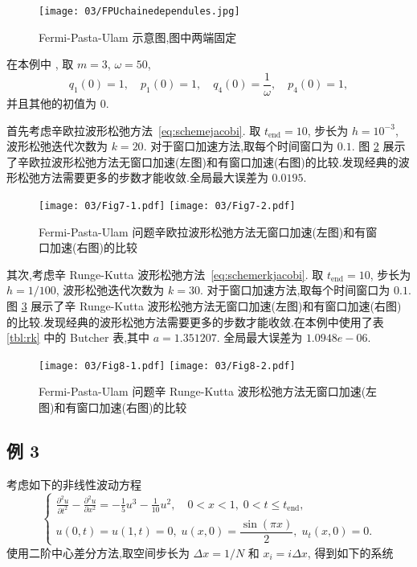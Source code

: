 \begin{figure}[h!]
  \centering
  \texttt{[image: 03/FPUchainedependules.jpg]}
  \caption{Fermi-Pasta-Ulam 示意图,图中两端固定}
  \label{fig:fpu}
\end{figure}

在本例中 \cite{hairer2006geometric}, 取 $m=3$, $\omega = 50$,
\begin{equation*}
  q_1(0) = 1, \quad p_1(0) = 1, \quad q_4(0) = \frac{1}{\omega}, \quad p_4(0) = 1,
\end{equation*}
并且其他的初值为 $0$.

首先考虑辛欧拉波形松弛方法~\eqref{eq:schemejacobi}. 取 $t_{\text{end}} = 10$, 步长为 $h = 10^{-3}$, 波形松弛迭代次数为 $k=20$. 对于窗口加速方法,取每个时间窗口为 $0.1$. 图 \ref{fig:ex2seucom} 展示了辛欧拉波形松弛方法无窗口加速(左图)和有窗口加速(右图)的比较.发现经典的波形松弛方法需要更多的步数才能收敛.全局最大误差为 $0.0195$.

\begin{figure}[h!]
  \centering
  \texttt{[image: 03/Fig7-1.pdf]}
  \texttt{[image: 03/Fig7-2.pdf]}
  \caption{Fermi-Pasta-Ulam 问题辛欧拉波形松弛方法无窗口加速(左图)和有窗口加速(右图)的比较}
  \label{fig:ex2seucom}
\end{figure}

其次,考虑辛 Runge-Kutta 波形松弛方法~\eqref{eq:schemerkjacobi}. 取 $t_{\text{end}} = 10$, 步长为 $h = 1/100$, 波形松弛迭代次数为 $k=30$. 对于窗口加速方法,取每个时间窗口为 $0.1$. 图 \ref{fig:ex2srkcom} 展示了辛 Runge-Kutta 波形松弛方法无窗口加速(左图)和有窗口加速(右图)的比较.发现经典的波形松弛方法需要更多的步数才能收敛.在本例中使用了表 \ref{tbl:rk} 中的 Butcher 表,其中 $a = 1.351207$. 全局最大误差为 $1.0948e-06$.

\begin{figure}[h!]
  \centering
  \texttt{[image: 03/Fig8-1.pdf]}
  \texttt{[image: 03/Fig8-2.pdf]}
  \caption{Fermi-Pasta-Ulam 问题辛 Runge-Kutta 波形松弛方法无窗口加速(左图)和有窗口加速(右图)的比较}
  \label{fig:ex2srkcom}
\end{figure}

\subsection*{例 3}
考虑如下的非线性波动方程 \cite{wu2013struc}
\begin{equation}\label{eq:nonlinwave}
  \left \{ \begin{array}{l}
      \displaystyle \frac{\partial^2 u }{\partial t^2}
      - \frac{\partial^2 u}{\partial x^2}
      = -\frac{1}{5} u^3 - \frac{1}{10} u^2, \quad 0<x<1, \; 0<t \leq t_{\text{end}},\\
      u(0,t) = u(1,t) = 0, \; u(x, 0) = \dfrac{\sin(\pi x)}{2}, \; u_t (x, 0) = 0.
    \end{array} \right.
\end{equation}
使用二阶中心差分方法,取空间步长为 $\Delta x = 1/N$ 和 $x_i = i \Delta x$, 得到如下的系统

